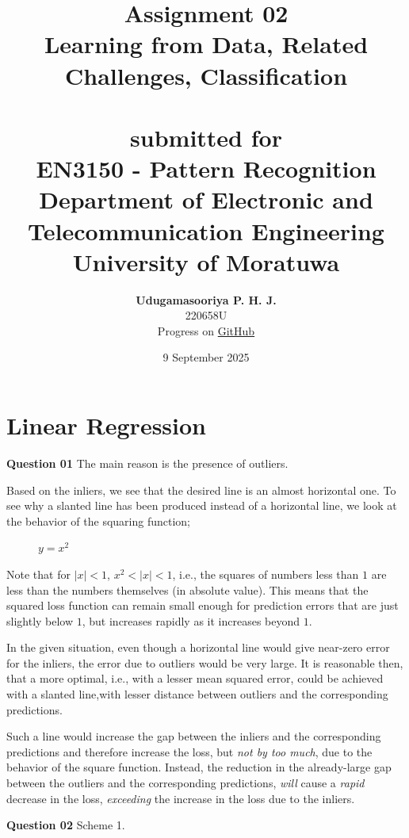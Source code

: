 \documentclass{article}[a4paper]
\title{
	\huge{\textbf{
		Assignment 02
	}}\\
	\Large{
		Learning from Data, Related Challenges, Classification
	}\\
	\large{\phantom{}}\\
	\large{
		submitted for
	}\\
	\LARGE{
		\textbf{EN3150 - Pattern Recognition}
	}\\
	\large{
		Department of Electronic and Telecommunication Engineering
	}
	\\
	\large{University of Moratuwa}
}
\author{
	\textbf{Udugamasooriya P. H. J.}\\
	220658U\\
	\small{Progress on \href{https://github.com/pulasthi-u/en3150-assignment02}{GitHub \extlink}}
}
\date{9 September 2025}
\begin{document}
	\setcounter{lstlisting}{3}
	\maketitle

	\section{Linear Regression}

	\textbf{Question 01} The main reason is the presence of outliers.
	
	Based on the inliers, we see that the desired line is an almost horizontal one. To see why a slanted line has been produced instead of a horizontal line, we look at the behavior of the squaring function;
	\begin{figure}[H]
		\centering
		\caption{$y = x^2$}
	\end{figure}
	Note that for $|x| < 1$, $x^2 < |x| < 1$, i.e., the squares of numbers less than $1$ are less than the numbers themselves (in absolute value). This means that the squared loss function can remain small enough for prediction errors that are just slightly below $1$, but increases rapidly as it increases beyond $1$.

	In the given situation, even though a horizontal line would give near-zero error for the inliers, the error due to outliers would be very large. It is reasonable then, that a more optimal, i.e., with a lesser mean squared error, could be achieved with a slanted line,with lesser distance between outliers and the corresponding predictions.

	Such a line would increase the gap between the inliers and the corresponding predictions and therefore increase the loss, but \textit{not by too much}, due to the behavior of the square function. Instead, the reduction in the already-large gap between the outliers and the corresponding predictions, \textit{will} cause a \textit{rapid} decrease in the loss, \textit{exceeding} the increase in the loss due to the inliers.
	\medskip
	
	\textbf{Question 02} Scheme 1.
	
\end{document}
